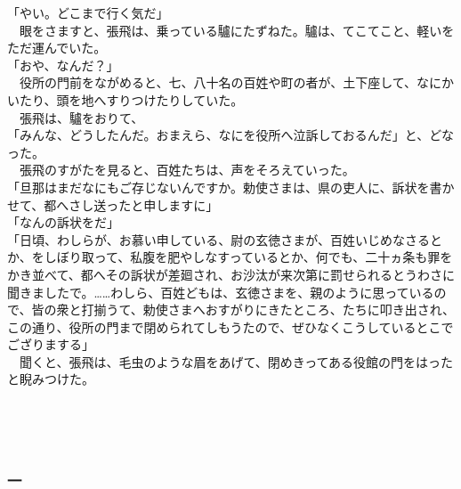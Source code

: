 \documentclass[
  paper=a5,
  fontsize=10pt,
  jafontsize=9.5pt,
  tate,                  %
  open_bracket_pos=nibu, %
]{jlreq}
\begin{document}
「やい。どこまで行く気だ」\\


　眼をさますと、張飛は、乗っている驢にたずねた。驢は、てこてこと、軽いをただ運んでいた。\\


「おや、なんだ？」\\


　役所の門前をながめると、七、八十名の百姓や町の者が、土下座して、なにかいたり、頭を地へすりつけたりしていた。\\


　張飛は、驢をおりて、\\


「みんな、どうしたんだ。おまえら、なにを役所へ泣訴しておるんだ」と、どなった。\\


　張飛のすがたを見ると、百姓たちは、声をそろえていった。\\


「旦那はまだなにもご存じないんですか。勅使さまは、県の吏人に、訴状を書かせて、都へさし送ったと申しますに」\\


「なんの訴状をだ」\\


「日頃、わしらが、お慕い申している、尉の玄徳さまが、百姓いじめなさるとか、をしぼり取って、私腹を肥やしなすっているとか、何でも、二十ヵ条も罪をかき並べて、都へその訴状が差廻され、お沙汰が来次第に罰せられるとうわさに聞きましたで。……わしら、百姓どもは、玄徳さまを、親のように思っているので、皆の衆と打揃うて、勅使さまへおすがりにきたところ、たちに叩き出され、この通り、役所の門まで閉められてしもうたので、ぜひなくこうしているとこでござりまする」\\


　聞くと、張飛は、毛虫のような眉をあげて、閉めきってある役館の門をはったと睨みつけた。\\

\\

\subsection{}

\\

\subsubsection{一}
\end{document}
